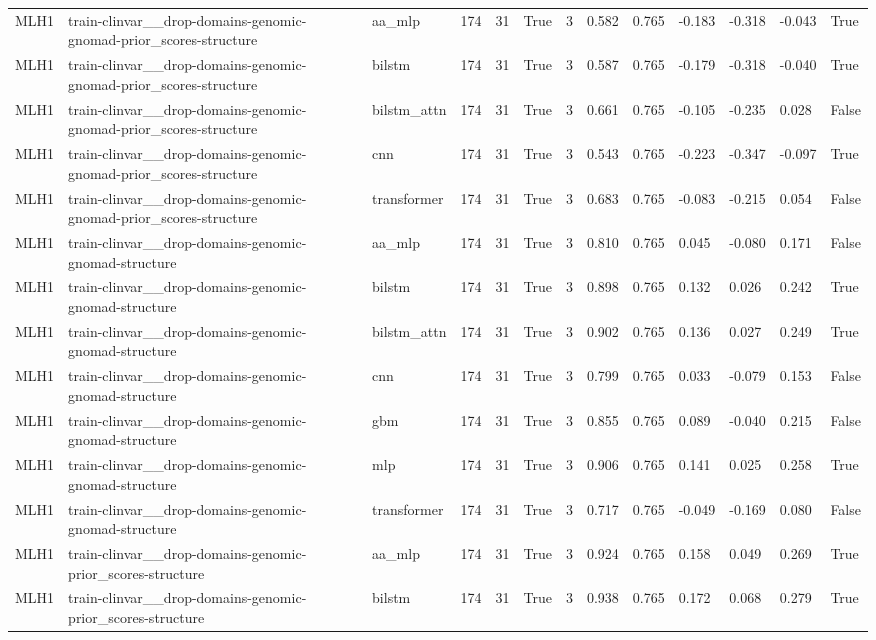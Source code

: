 \begin{table}[t]
\begin{tabular}{lllllllllllll}
MLH1 & train-clinvar\_\_drop-domains-genomic-gnomad-prior\_scores-structure & aa\_mlp & 174 & 31 & True & 3 & 0.582 & 0.765 & -0.183 & -0.318 & -0.043 & True \\
MLH1 & train-clinvar\_\_drop-domains-genomic-gnomad-prior\_scores-structure & bilstm & 174 & 31 & True & 3 & 0.587 & 0.765 & -0.179 & -0.318 & -0.040 & True \\
MLH1 & train-clinvar\_\_drop-domains-genomic-gnomad-prior\_scores-structure & bilstm\_attn & 174 & 31 & True & 3 & 0.661 & 0.765 & -0.105 & -0.235 & 0.028 & False \\
MLH1 & train-clinvar\_\_drop-domains-genomic-gnomad-prior\_scores-structure & cnn & 174 & 31 & True & 3 & 0.543 & 0.765 & -0.223 & -0.347 & -0.097 & True \\
MLH1 & train-clinvar\_\_drop-domains-genomic-gnomad-prior\_scores-structure & transformer & 174 & 31 & True & 3 & 0.683 & 0.765 & -0.083 & -0.215 & 0.054 & False \\
MLH1 & train-clinvar\_\_drop-domains-genomic-gnomad-structure & aa\_mlp & 174 & 31 & True & 3 & 0.810 & 0.765 & 0.045 & -0.080 & 0.171 & False \\
MLH1 & train-clinvar\_\_drop-domains-genomic-gnomad-structure & bilstm & 174 & 31 & True & 3 & 0.898 & 0.765 & 0.132 & 0.026 & 0.242 & True \\
MLH1 & train-clinvar\_\_drop-domains-genomic-gnomad-structure & bilstm\_attn & 174 & 31 & True & 3 & 0.902 & 0.765 & 0.136 & 0.027 & 0.249 & True \\
MLH1 & train-clinvar\_\_drop-domains-genomic-gnomad-structure & cnn & 174 & 31 & True & 3 & 0.799 & 0.765 & 0.033 & -0.079 & 0.153 & False \\
MLH1 & train-clinvar\_\_drop-domains-genomic-gnomad-structure & gbm & 174 & 31 & True & 3 & 0.855 & 0.765 & 0.089 & -0.040 & 0.215 & False \\
MLH1 & train-clinvar\_\_drop-domains-genomic-gnomad-structure & mlp & 174 & 31 & True & 3 & 0.906 & 0.765 & 0.141 & 0.025 & 0.258 & True \\
MLH1 & train-clinvar\_\_drop-domains-genomic-gnomad-structure & transformer & 174 & 31 & True & 3 & 0.717 & 0.765 & -0.049 & -0.169 & 0.080 & False \\
MLH1 & train-clinvar\_\_drop-domains-genomic-prior\_scores-structure & aa\_mlp & 174 & 31 & True & 3 & 0.924 & 0.765 & 0.158 & 0.049 & 0.269 & True \\
MLH1 & train-clinvar\_\_drop-domains-genomic-prior\_scores-structure & bilstm & 174 & 31 & True & 3 & 0.938 & 0.765 & 0.172 & 0.068 & 0.279 & True \\

\end{tabular}
\end{table}
